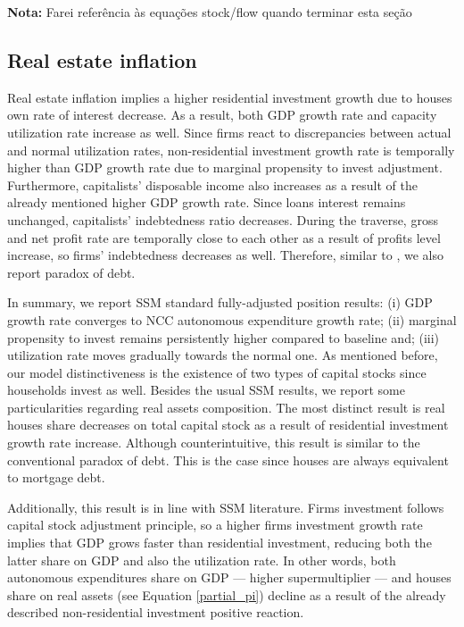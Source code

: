 \documentclass[11pt]{article}
\begin{document}
\textbf{Nota:} Farei referência às equações stock/flow quando terminar esta seção

\subsection{Real estate inflation}
\label{sec:orgfc97bb8}
\label{sec:Exp2}


Real estate inflation implies a higher residential investment growth due to houses own rate of interest decrease.
As a result, both GDP growth rate and capacity utilization rate increase as well.
Since firms react to discrepancies between actual and normal utilization rates, non-residential investment growth rate 
is temporally higher than GDP growth rate due to marginal propensity to invest adjustment.
Furthermore, capitalists' disposable income also increases as a result of the already mentioned higher GDP growth rate.
Since loans interest remains unchanged, capitalists' indebtedness ratio decreases.
During the traverse, gross and net profit rate are temporally close to each other as a result of profits level increase, so firms' indebtedness decreases as well.
Therefore, similar to \textcite{mandarino-2020-worker-debt}, we also report paradox of debt.

In summary, we report SSM standard fully-adjusted position results:
    (i) GDP growth rate converges to NCC autonomous expenditure growth rate;
    (ii) marginal propensity to invest remains persistently higher compared to baseline and;
    (iii) utilization rate moves gradually towards the normal one.
As mentioned before, our model distinctiveness is the existence of two types of capital stocks since households invest as well.
Besides the usual SSM results, we report some particularities regarding real assets composition.
The most distinct result is real houses share decreases on total capital stock as a result of residential investment growth rate increase.
Although counterintuitive, this result is similar to the conventional paradox of debt.
This is the case since houses are always equivalent to  mortgage debt.


Additionally, this result is in line with SSM literature.
Firms investment follows capital stock adjustment principle, so a higher firms investment growth rate implies that
GDP grows faster than residential investment, reducing both the latter share on GDP and
also the utilization rate.
In other words, both autonomous expenditures share on GDP --- higher supermultiplier --- and houses share on real assets (see Equation \ref{partial_pi}) decline as a result of the already described non-residential investment positive reaction.
\end{document}
